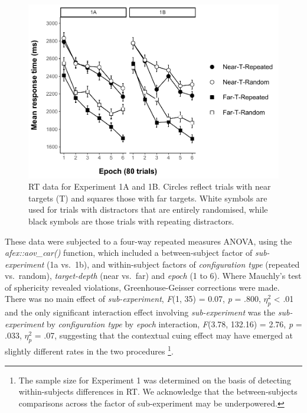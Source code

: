 \documentclass[
  man,floatsintext]{apa7}
\begin{document}
\begin{figure}

{\centering \includegraphics[width=1\linewidth]{CCVR_manuscript_files/figure-latex/Exp1-RT-figure-1} 

}

\caption{RT data for Experiment 1A and 1B. Circles reflect trials with near targets (T) and squares those with far targets. White symbols are used for trials with distractors that are entirely randomised, while black symbols are those trials with repeating distractors.}\label{fig:Exp1-RT-figure}
\end{figure}

These data were subjected to a four-way repeated measures ANOVA, using the \emph{afex::aov\_car()} function, which included a between-subject factor of \emph{sub-experiment} (1a vs.~1b), and within-subject factors of \emph{configuration type} (repeated vs.~random), \emph{target-depth} (near vs.~far) and \emph{epoch} (1 to 6). Where Mauchly's test of sphericity revealed violations, Greenhouse-Geisser corrections were made. There was no main effect of \emph{sub-experiment}, \emph{F}(1, 35) = 0.07, \emph{p} = .800, \(\eta^2_p\) \textless{} .01 and the only significant interaction effect involving \emph{sub-experiment} was the \emph{sub-experiment} by \emph{configuration type} by \emph{epoch} interaction, \emph{F}(3.78, 132.16) = 2.76, \emph{p} = .033, \(\eta^2_p\) = .07, suggesting that the contextual cuing effect may have emerged at slightly different rates in the two procedures \footnote{The sample size for Experiment 1 was determined on the basis of detecting within-subjects differences in RT. We acknowledge that the between-subjects comparisons across the factor of sub-experiment may be underpowered.}.
\end{document}
